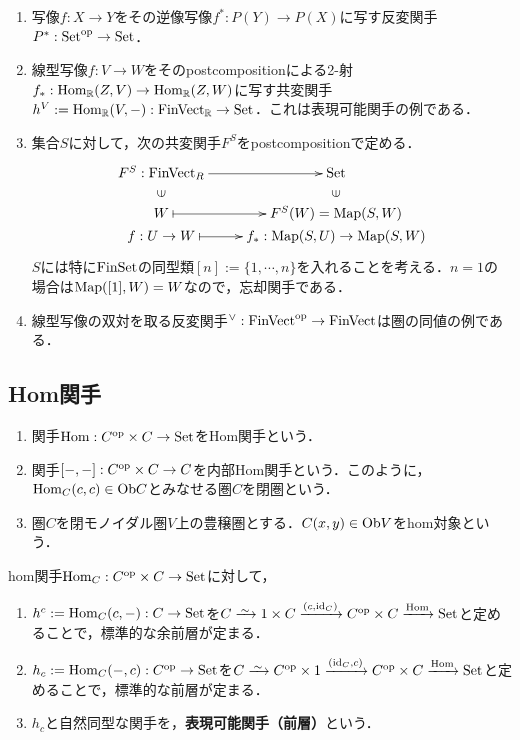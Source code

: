 \documentclass[uplatex,dvipdfmx]{jsreport}
\begin{document}
\begin{example}\mbox{}
    \begin{enumerate}
        \item 写像$f:X\to Y$をその逆像写像$f^*:P(Y)\to P(X)$に写す反変関手$P^*:\mathrm{Set}^{\mathrm{op}}\to\mathrm{Set}$．
        \item 線型写像$f:V\to W$をそのpostcompositionによる2-射$f_*:\mathrm{Hom}_{\mathbb{R}}(Z,V)\to\mathrm{Hom}_{\mathbb{R}}(Z,W)$に写す共変関手$h^V:=\mathrm{Hom}_{\mathbb{R}}(V,-):\mathrm{FinVect}_{\mathbb{R}}\to\mathrm{Set}$．これは表現可能関手の例である．
        \item 集合$S$に対して，次の共変関手$F^S$をpostcompositionで定める．
        \[\xymatrix@R-2pc{
            F^S:\FinVect_R\ar[r]&\Set\\
            \rotatebox[origin=c]{90}{$\in$}&\rotatebox[origin=c]{90}{$\in$}\\
            W\ar@{|->}[r]&F^S(W)=\Map(S,W)\\
            f:U\to W\ar@{|->}[r]&f_*:\Map(S,U)\to\Map(S,W)
        }\]
        $S$には特に$\mathrm{FinSet}$の同型類$[n]:=\{1,\cdots,n\}$を入れることを考える．$n=1$の場合は$\mathrm{Map}([1],W)=W$なので，忘却関手である．
        \item 線型写像の双対を取る反変関手${}^\vee:\mathrm{FinVect}^{\mathrm{op}}\to\mathrm{FinVect}$は圏の同値の例である．
    \end{enumerate}
\end{example}

\subsection{Hom関手}

\begin{definition}\mbox{}
    \begin{enumerate}
        \item 関手$\mathrm{Hom}:C^{\mathrm{op}}\times C\to\mathrm{Set}$をHom関手という．
        \item 関手$[-,-]:C^{\mathrm{op}}\times C\to C$を内部Hom関手という．このように，$\mathrm{Hom}_C(c,c)\in\mathrm{Ob} C$とみなせる圏$C$を閉圏という．
        \item 圏$C$を閉モノイダル圏$V$上の豊穣圏とする．$C(x,y)\in\mathrm{Ob} V$をhom対象という．
    \end{enumerate}
\end{definition}

\begin{definition}
    hom関手$\mathrm{Hom}_C:C^{\mathrm{op}}\times C\to\mathrm{Set}$に対して，
    \begin{enumerate}
        \item $h^c:=\mathrm{Hom}_C(c,-):C\to\mathrm{Set}$を$C\iso 1\times C\xrightarrow{(c,\id_C)}C^\op\times C\xrightarrow{\Hom}\Set$と定めることで，標準的な余前層が定まる．
        \item $h_c:=\mathrm{Hom}_C(-,c):C^{\mathrm{op}}\to\mathrm{Set}$を$C\iso C^\op\times 1\xrightarrow{(\id_C,c)}C^\op\times C\xrightarrow{\Hom}\Set$と定めることで，標準的な前層が定まる．
        \item $h_c$と自然同型な関手を，\textbf{表現可能関手（前層）}という．
    \end{enumerate}
\end{definition}
\end{document}
